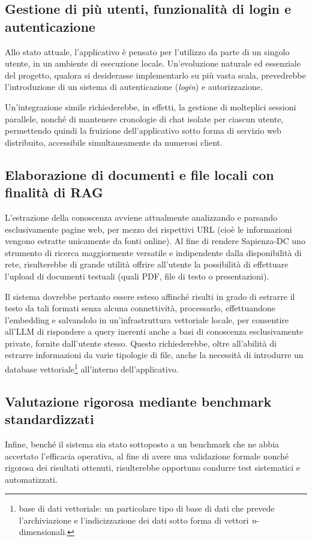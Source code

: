 \subsection{Gestione di più utenti, funzionalità di login e autenticazione}
Allo stato attuale, l'applicativo è pensato per l'utilizzo da parte di un singolo utente, in un ambiente di esecuzione locale. Un'evoluzione naturale ed essenziale del progetto, qualora si desiderasse implementarlo su più vasta scala, prevedrebbe l'introduzione di un sistema di autenticazione (\textit{login}) e autorizzazione. 

Un’integrazione simile richiederebbe, in effetti, la gestione di molteplici sessioni parallele, nonché di mantenere cronologie di chat isolate per ciascun utente, permettendo quindi la fruizione dell’applicativo sotto forma di servizio web distribuito, accessibile simultaneamente da numerosi client.

\subsection{Elaborazione di documenti e file locali con finalità di RAG}
L'estrazione della conoscenza avviene attualmente analizzando e parsando esclusivamente pagine web, per mezzo dei rispettivi URL (cioè le informazioni vengono estratte unicamente da fonti online). Al fine di rendere Sapienza-DC uno strumento di ricerca maggiormente versatile e indipendente dalla disponibilità di rete, risulterebbe di grande utilità offrire all'utente la possibilità di effettuare l'upload di documenti testuali (quali PDF, file di testo o presentazioni). 

Il sistema dovrebbe pertanto essere esteso affinché risulti in grado di estrarre il testo da tali formati senza alcuna connettività, processarlo, effettuandone l'embedding e salvandolo in un'infrastruttura vettoriale locale, per consentire all'LLM di rispondere a query inerenti anche a basi di conoscenza esclusivamente private, fornite dall'utente stesso. Questo richiederebbe, oltre all'abilità di estrarre informazioni da varie tipologie di file, anche la necessità di introdurre un database vettoriale\footnote{base di dati vettoriale: un particolare tipo di base di dati che prevede l'archiviazione e l'indicizzazione dei dati sotto forma di vettori \textit{n}-dimensionali.} all'interno dell'applicativo.

\subsection{Valutazione rigorosa mediante benchmark standardizzati}
Infine, benché il sistema sia stato sottoposto a un benchmark che ne abbia accertato l'efficacia operativa, al fine di avere una validazione formale nonché rigorosa dei risultati ottenuti, risulterebbe opportuno condurre test sistematici e automatizzati.

